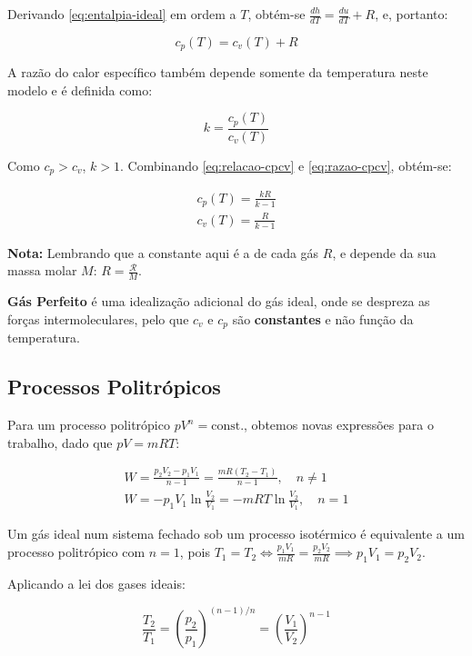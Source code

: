 Derivando \ref{eq:entalpia-ideal} em ordem a $T$, obtém-se $\frac{dh}{dT} = \frac{du}{dT} + R$, e, portanto:

\begin{equation} \label{eq:relacao-cpcv}
    c_p(T) = c_v(T) + R
\end{equation}

A razão do calor específico também depende somente da temperatura neste modelo e é definida como:

\begin{equation} \label{eq:razao-cpcv}
    k = \frac{c_p(T)}{c_v(T)}
\end{equation}

Como $c_p > c_v$, $k>1$. Combinando \ref{eq:relacao-cpcv} e \ref{eq:razao-cpcv}, obtém-se:

\begin{eqnarray}
    c_p(T) = \frac{k R}{k -1} \\
    c_v(T) = \frac{R}{k -1}
\end{eqnarray}

\textbf{Nota:} Lembrando que a constante aqui é a de cada gás $R$, e depende da sua massa molar $M$: $R = \frac{\mathcal{R}}{M}$.

\textbf{Gás Perfeito} é uma idealização adicional do gás ideal, onde se despreza as forças intermoleculares, pelo que $c_v$ e $c_p$ são \textbf{constantes} e não função da temperatura.

\subsection{Processos Politrópicos}

Para um processo politrópico $pV^n = \text{const.}$, obtemos novas expressões para o trabalho, dado que $pV = mRT$:

\begin{eqnarray}
    W = \frac{p_2 V_2 - p_1 V_1}{n - 1} = \frac{mR (T_2 - T_1)}{n - 1}, \quad n \neq 1 \\
    W = - p_1 V_1 \ln \frac{V_2}{V_1} = - mRT \ln \frac{V_2}{V_1}, \quad n = 1 \label{eq:trabalho-gas-ideal}
\end{eqnarray}

Um gás ideal num sistema fechado sob um processo isotérmico é equivalente a um processo politrópico com $n=1$, pois $T_1 = T_2 \Longleftrightarrow \frac{p_1 V_1}{mR} = \frac{p_2 V_2}{mR} \implies p_1 V_1 = p_2 V_2$.

Aplicando a lei dos gases ideais:

\begin{equation}
    \frac{T_2}{T_1} = \left( \frac{p_2}{p_1} \right)^{(n-1)/n} = \left( \frac{V_1}{V_2} \right)^{n-1}
\end{equation}


